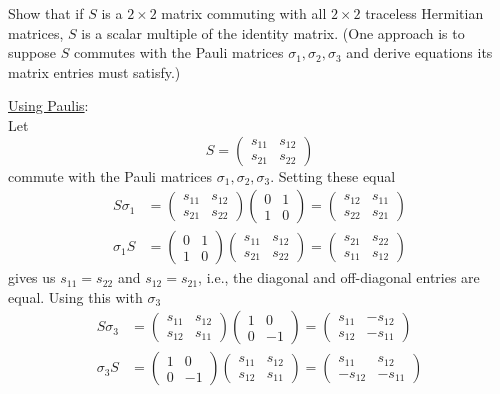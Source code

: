 \documentclass[10pt]{article}
\begin{document}
\begin{example}\label{b2e24}
	Show that if $S$ is a $2\times2$ matrix commuting with all $2\times2$ traceless Hermitian matrices, $S$ is a scalar multiple of the identity matrix. (One approach is to suppose $S$ commutes with the Pauli matrices $\sigma_1, \sigma_2, \sigma_3$ and derive equations its matrix entries must satisfy.)
\end{example}
\sol \underline{Using Paulis}:\\
Let
$$
S = \begin{pmatrix}
	s_{11}&s_{12}\\s_{21}&s_{22}
\end{pmatrix}
$$
commute with the Pauli matrices $\sigma_1, \sigma_2, \sigma_3$. Setting these equal
$$
\begin{aligned}
	S\sigma_1 &= \begin{pmatrix}
		s_{11}&s_{12}\\s_{21}&s_{22}
	\end{pmatrix}\begin{pmatrix}
		0&1\\1&0
	\end{pmatrix} = \begin{pmatrix}
		s_{12}&s_{11}\\s_{22}&s_{21}
	\end{pmatrix}\\
	\sigma_1S &= \begin{pmatrix}
		0&1\\1&0
	\end{pmatrix}\begin{pmatrix}
		s_{11}&s_{12}\\s_{21}&s_{22}
	\end{pmatrix} = \begin{pmatrix}
		s_{21}&s_{22}\\s_{11}&s_{12}
	\end{pmatrix}
\end{aligned}
$$
gives us $s_{11} = s_{22}$ and  $s_{12} = s_{21}$, i.e., the diagonal and off-diagonal entries are equal. Using this with $\sigma_3$
$$
\begin{aligned}
	S\sigma_3 &= \begin{pmatrix}
		s_{11}&s_{12}\\s_{12}&s_{11}
	\end{pmatrix}\begin{pmatrix}
		1&0\\0&-1
	\end{pmatrix} = \begin{pmatrix}
		s_{11}&-s_{12}\\s_{12}&-s_{11}
	\end{pmatrix}\\
	\sigma_3S &= \begin{pmatrix}
		1&0\\0&-1
	\end{pmatrix}\begin{pmatrix}
		s_{11}&s_{12}\\s_{12}&s_{11}
	\end{pmatrix} = \begin{pmatrix}
		s_{11}&s_{12}\\-s_{12}&-s_{11}
	\end{pmatrix}
\end{aligned}
$$
\end{document}
